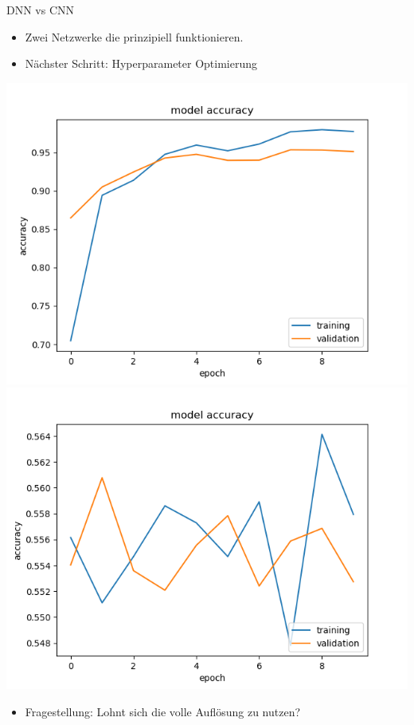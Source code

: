 \documentclass[aspectratio=1610, 9pt]{beamer}
\begin{document}
\begin{frame}{DNN vs CNN}
  \begin{itemize}
  \item Zwei Netzwerke die prinzipiell funktionieren.
  \item Nächster Schritt: Hyperparameter Optimierung
  \end{itemize}
  \includegraphics[scale=0.3]{images/cnn_acc.png}
  \includegraphics[scale=0.3]{images/dnn_acc.png}
  \begin{itemize}
  \item Fragestellung: Lohnt sich die volle Auflösung zu nutzen?
  \end{itemize}
\end{frame}
\end{document}
